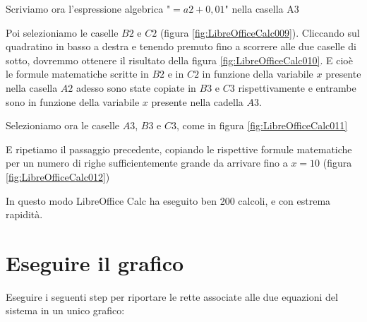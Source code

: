 \documentclass[17pt]{extarticle}
\begin{document}
Scriviamo ora l'espressione algebrica "$=a2 + 0,01$" nella casella A3



Poi selezioniamo le caselle $B2$ e $C2$ (figura \ref{fig:LibreOfficeCalc009}). Cliccando sul quadratino in basso a destra e tenendo premuto fino a scorrere alle due caselle di sotto, dovremmo ottenere il risultato della figura \ref{fig:LibreOfficeCalc010}. E cioè le formule matematiche scritte in $B2$ e in $C2$ in funzione della variabile $x$ presente nella casella $A2$ adesso sono state copiate in $B3$ e $C3$ rispettivamente e entrambe sono in funzione della variabile $x$ presente nella cadella $A3$.







Selezioniamo ora le caselle $A3$, $B3$ e $C3$, come in figura \ref{fig:LibreOfficeCalc011}



E ripetiamo il passaggio precedente, copiando le rispettive formule matematiche per un numero di righe sufficientemente grande da arrivare fino a $x = 10$ (figura \ref{fig:LibreOfficeCalc012})




In questo modo LibreOffice Calc ha eseguito ben 200 calcoli, e con estrema rapidità.

\newpage

\section{Eseguire il grafico}


Eseguire i seguenti step per riportare le rette associate alle due equazioni del sistema in un unico grafico:
\end{document}
